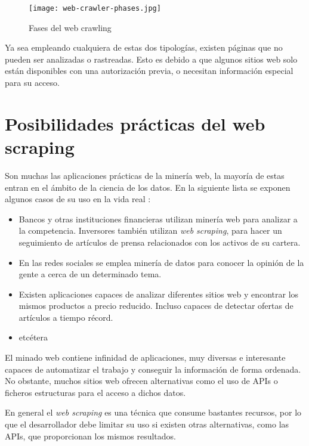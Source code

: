 \begin{figure}[tphb]
\centering
\texttt{[image: web-crawler-phases.jpg]}
\caption{Fases del web crawling}
\label{img:web-crawler-phases}
\end{figure}

Ya sea empleando cualquiera de estas dos tipologías, existen páginas que no pueden ser analizadas o
rastreadas. Esto es debido a que algunos sitios web solo están disponibles con una autorización previa, o
necesitan información especial para su acceso.

\section{Posibilidades prácticas del web scraping}
\label{sec:posibilidades practicas del web scraping}

Son muchas las aplicaciones prácticas de la minería web, la mayoría de estas entran en el ámbito de la
ciencia de los datos. En la siguiente lista se exponen algunos casos de su uso en la vida real
\cite{web-scraping-seppe}:

\begin{itemize}
    \item Bancos y otras instituciones financieras utilizan minería web para analizar a la competencia.
    Inversores también utilizan \emph{web scraping}, para hacer un seguimiento de artículos de prensa 
    relacionados con los activos de su cartera.

    \item En las redes sociales se emplea minería de datos para conocer la opinión de la gente a cerca de 
    un determinado tema.

    \item Existen aplicaciones capaces de analizar diferentes sitios web y encontrar los mismos productos 
    a precio reducido. Incluso capaces de detectar ofertas de artículos a tiempo récord.

    \item etcétera
\end{itemize}

El minado web contiene infinidad de aplicaciones, muy diversas e interesante capaces de automatizar el
trabajo y conseguir la información de forma ordenada. No obstante, muchos sitios web ofrecen alternativas 
como el uso de APIs o ficheros estructuras para el acceso a dichos datos. 

En general el \emph{web scraping} es una técnica que consume bastantes recursos, por lo que el desarrollador 
debe limitar su uso si existen otras alternativas, como las APIs, que proporcionan los mismos resultados.

